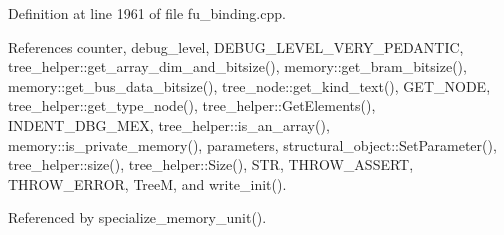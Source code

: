 Definition at line 1961 of file fu\+\_\+binding.\+cpp.



References counter, debug\+\_\+level, D\+E\+B\+U\+G\+\_\+\+L\+E\+V\+E\+L\+\_\+\+V\+E\+R\+Y\+\_\+\+P\+E\+D\+A\+N\+T\+IC, tree\+\_\+helper\+::get\+\_\+array\+\_\+dim\+\_\+and\+\_\+bitsize(), memory\+::get\+\_\+bram\+\_\+bitsize(), memory\+::get\+\_\+bus\+\_\+data\+\_\+bitsize(), tree\+\_\+node\+::get\+\_\+kind\+\_\+text(), G\+E\+T\+\_\+\+N\+O\+DE, tree\+\_\+helper\+::get\+\_\+type\+\_\+node(), tree\+\_\+helper\+::\+Get\+Elements(), I\+N\+D\+E\+N\+T\+\_\+\+D\+B\+G\+\_\+\+M\+EX, tree\+\_\+helper\+::is\+\_\+an\+\_\+array(), memory\+::is\+\_\+private\+\_\+memory(), parameters, structural\+\_\+object\+::\+Set\+Parameter(), tree\+\_\+helper\+::size(), tree\+\_\+helper\+::\+Size(), S\+TR, T\+H\+R\+O\+W\+\_\+\+A\+S\+S\+E\+RT, T\+H\+R\+O\+W\+\_\+\+E\+R\+R\+OR, TreeM, and write\+\_\+init().



Referenced by specialize\+\_\+memory\+\_\+unit().

